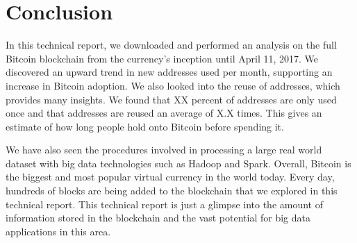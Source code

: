 \documentclass[9pt,twocolumn,twoside]{idsi}
\begin{document}
\section{Conclusion}
In this technical report, we downloaded and performed an analysis on the full Bitcoin blockchain from the currency's inception until April 11, 2017. We discovered an upward trend in new addresses used per month, supporting an increase in Bitcoin adoption. We also looked into the reuse of addresses, which provides many insights. We found that XX percent of addresses are only used once and that addresses are reused an average of X.X times. This gives an estimate of how long people hold onto Bitcoin before spending it.

We have also seen the procedures involved in processing a large real world dataset with big data technologies such as Hadoop and Spark. Overall, Bitcoin is the biggest and most popular virtual currency in the world today. Every day, hundreds of blocks are being added to the blockchain that we explored in this technical report. This technical report is just a glimpse into the amount of information stored in the blockchain and the vast potential for big data applications in this area.
\end{document}
